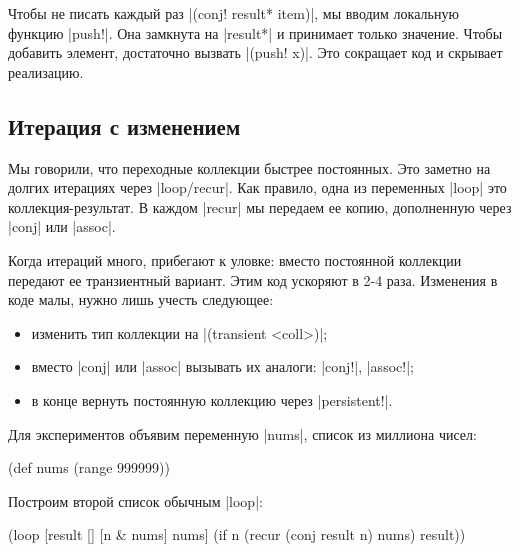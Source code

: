 Чтобы не писать каждый раз \spverb|(conj! result* item)|, мы
вводим локальную функцию \spverb|push!|. Она замкнута на \spverb|result*| и
принимает только значение. Чтобы добавить элемент, достаточно вызвать
\spverb|(push! x)|. Это сокращает код и скрывает реализацию.

\subsection{Итерация с изменением}

Мы говорили, что переходные коллекции быстрее постоянных. Это заметно на долгих
итерациях через \spverb|loop/recur|. Как правило, одна из переменных
\spverb|loop| это коллекция-результат. В каждом \spverb|recur| мы передаем ее
копию, дополненную через \spverb|conj| или \spverb|assoc|.

Когда итераций много, прибегают к уловке: вместо постоянной коллекции передают
ее транзиентный вариант. Этим код ускоряют в 2-4 раза. Изменения в коде малы,
нужно лишь учесть следующее:

\begin{itemize}

\item
  изменить тип коллекции на \spverb|(transient <coll>)|;

\item
  вместо \spverb|conj| или \spverb|assoc| вызывать их аналоги: \spverb|conj!|,
  \spverb|assoc!|;

\item
  в конце вернуть постоянную коллекцию через \spverb|persistent!|.

\end{itemize}

Для экспериментов объявим переменную \spverb|nums|, список из миллиона чисел:

\begin{english}
  \begin{clojure}
(def nums (range 999999))
  \end{clojure}
\end{english}

\noindent
Построим второй список обычным \spverb|loop|:

\begin{english}
  \begin{clojure}
(loop [result []
       [n & nums] nums]
  (if n
    (recur (conj result n) nums)
    result))
  \end{clojure}
\end{english}

